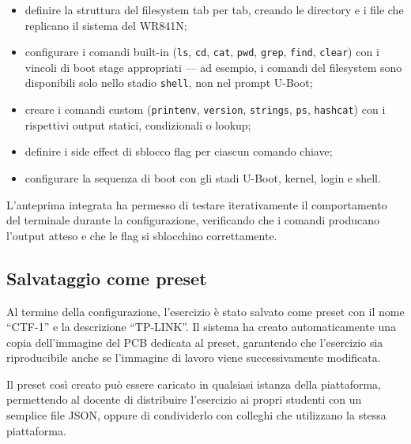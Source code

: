\begin{itemize}
    \item definire la struttura del filesystem tab per tab, creando le directory e i file che replicano il sistema del WR841N;
    \item configurare i comandi built-in (\texttt{ls}, \texttt{cd}, \texttt{cat}, \texttt{pwd}, \texttt{grep}, \texttt{find}, \texttt{clear}) con i vincoli di boot stage appropriati --- ad esempio, i comandi del filesystem sono disponibili solo nello stadio \texttt{shell}, non nel prompt U-Boot;
    \item creare i comandi custom (\texttt{printenv}, \texttt{version}, \texttt{strings}, \texttt{ps}, \texttt{hashcat}) con i rispettivi output statici, condizionali o lookup;
    \item definire i side effect di sblocco flag per ciascun comando chiave;
    \item configurare la sequenza di boot con gli stadi U-Boot, kernel, login e shell.
\end{itemize}

L'anteprima integrata ha permesso di testare iterativamente il comportamento del terminale durante la configurazione, verificando che i comandi producano l'output atteso e che le flag si sblocchino correttamente.

\subsection{Salvataggio come preset}
\label{subsec:salvataggio-preset}

Al termine della configurazione, l'esercizio è stato salvato come preset con il nome ``CTF-1'' e la descrizione ``TP-LINK''. Il sistema ha creato automaticamente una copia dell'immagine del PCB dedicata al preset, garantendo che l'esercizio sia riproducibile anche se l'immagine di lavoro viene successivamente modificata.

Il preset così creato può essere caricato in qualsiasi istanza della piattaforma, permettendo al docente di distribuire l'esercizio ai propri studenti con un semplice file JSON, oppure di condividerlo con colleghi che utilizzano la stessa piattaforma.

